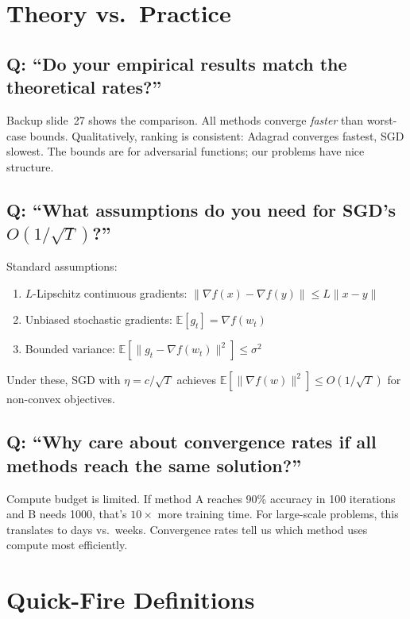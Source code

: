 \documentclass[10pt,a4paper]{article}
\begin{document}
\section{Theory vs.\ Practice}

\subsection{Q: ``Do your empirical results match the theoretical rates?''}
Backup slide~27 shows the comparison.
All methods converge \emph{faster} than worst-case bounds.
Qualitatively, ranking is consistent: Adagrad converges fastest, SGD slowest.
The bounds are for adversarial functions; our problems have nice structure.

\subsection{Q: ``What assumptions do you need for SGD's $O(1/\sqrt{T})$?''}
Standard assumptions:
\begin{enumerate}[nosep]
  \item $L$-Lipschitz continuous gradients: $\|\nabla f(x) - \nabla f(y)\| \leq L\|x - y\|$
  \item Unbiased stochastic gradients: $\mathbb{E}[g_t] = \nabla f(w_t)$
  \item Bounded variance: $\mathbb{E}[\|g_t - \nabla f(w_t)\|^2] \leq \sigma^2$
\end{enumerate}
Under these, SGD with $\eta = c/\sqrt{T}$ achieves $\mathbb{E}[\|\nabla f(w)\|^2] \leq O(1/\sqrt{T})$ for non-convex objectives.

\subsection{Q: ``Why care about convergence rates if all methods reach the same solution?''}
Compute budget is limited.
If method A reaches 90\% accuracy in 100 iterations and B needs 1000, that's $10\times$ more training time.
For large-scale problems, this translates to days vs.\ weeks.
Convergence rates tell us which method uses compute most efficiently.

\section{Quick-Fire Definitions}
\end{document}
